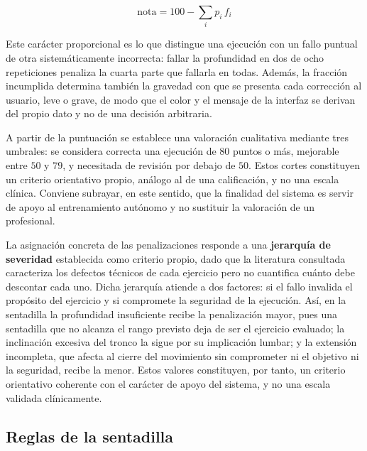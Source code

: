 \documentclass[12pt,a4paper,twoside,openright]{book}
\begin{document}
    \begin{equation}
        \text{nota} = 100 - \sum_{i} p_i \, f_i
        \label{eq:puntuacion}
    \end{equation}

    Este carácter proporcional es lo que distingue una ejecución con un fallo
    puntual de otra sistemáticamente incorrecta: fallar la profundidad en dos de
    ocho repeticiones penaliza la cuarta parte que fallarla en todas. Además, la
    fracción incumplida determina también la gravedad con que se presenta cada
    corrección al usuario, leve o grave, de modo que el color y el mensaje
    de la interfaz se derivan del propio dato y no de una decisión arbitraria.

    A partir de la puntuación se establece una valoración cualitativa mediante
    tres umbrales: se considera correcta una ejecución de $80$ puntos o más,
    mejorable entre $50$ y $79$, y necesitada de revisión por debajo de $50$.
    Estos cortes constituyen un criterio orientativo propio, an\'alogo al de una
    calificación, y no una escala clínica. Conviene subrayar, en este sentido,
    que la finalidad del sistema es servir de apoyo al entrenamiento autónomo y
    no sustituir la valoración de un profesional.

    La asignación concreta de las penalizaciones responde a una \textbf{jerarquía
    de severidad} establecida como criterio propio, dado que la literatura
    consultada caracteriza los defectos técnicos de cada ejercicio pero no
    cuantifica cuánto debe descontar cada uno. Dicha jerarquía atiende a dos
    factores: si el fallo invalida el propósito del ejercicio y si compromete la
    seguridad de la ejecución. Así, en la sentadilla la profundidad insuficiente
    recibe la penalización mayor, pues una sentadilla que no alcanza el rango
    previsto deja de ser el ejercicio evaluado; la inclinación excesiva del tronco
    la sigue por su implicación lumbar; y la extensión incompleta, que afecta al
    cierre del movimiento sin comprometer ni el objetivo ni la seguridad, recibe
    la menor. Estos valores constituyen, por tanto, un criterio orientativo
    coherente con el carácter de apoyo del sistema, y no una escala validada
    clínicamente.

    \subsection{Reglas de la sentadilla}
\end{document}
